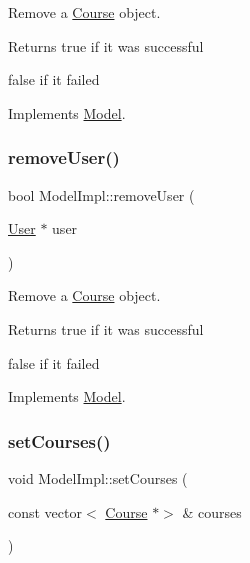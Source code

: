 Remove a \hyperlink{classCourse}{Course} object. 

\begin{DoxyReturn}{Returns}
true if it was successful 

false if it failed 
\end{DoxyReturn}


Implements \hyperlink{classModel_acc20a58c9a9c7506b06df890e287433e}{Model}.

\mbox{\label{classModelImpl_a51130aa538cd27b1cac6919cbbef05ee}} 
\subsubsection{\texorpdfstring{remove\+User()}{removeUser()}}
{\footnotesize\ttfamily bool Model\+Impl\+::remove\+User (\begin{DoxyParamCaption}\item[{\hyperlink{classUser}{User} $\ast$}]{user }\end{DoxyParamCaption})\hspace{0.3cm}{\ttfamily [virtual]}}



Remove a \hyperlink{classCourse}{Course} object. 

\begin{DoxyReturn}{Returns}
true if it was successful 

false if it failed 
\end{DoxyReturn}


Implements \hyperlink{classModel_ad217703837ecec908995225f6de1bfca}{Model}.

\mbox{\label{classModelImpl_ae90d5e4e7ec786f3752a6551dab39d66}} 
\subsubsection{\texorpdfstring{set\+Courses()}{setCourses()}}
{\footnotesize\ttfamily void Model\+Impl\+::set\+Courses (\begin{DoxyParamCaption}\item[{const vector$<$ \hyperlink{classCourse}{Course} $\ast$$>$ \&}]{courses }\end{DoxyParamCaption})\hspace{0.3cm}{\ttfamily [virtual]}}



